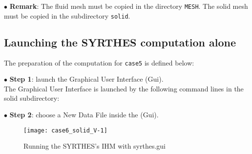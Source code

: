 $\bullet$ {\bf Remark}: The fluid mesh must be copied in the directory \texttt{MESH}.
The solid mesh must be copied in the subdirectory \texttt{solid}.
\newpage

\subsection{Launching the SYRTHES computation alone}

The preparation of the computation for \texttt{case5} is defined below:                                \\

$\bullet$ {\bf Step 1}: launch the \syrthes Graphical User Interface (Gui).\\
The \syrthes Graphical User Interface is launched by the following command lines in the solid subdirectory:\\

$\bullet$ {\bf Step 2}: choose a New Data File inside the (Gui). \\
\begin{figure}[h!]
\begin{center}
\texttt{[image: case6\_solid\_V-1]}
\caption{Running the SYRTHES's IHM with syrthes.gui}
\label{fig1_e5}
\end{center}
\end{figure}
\newpage

